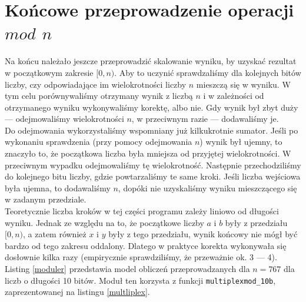 \documentclass[a4paper]{article}
\begin{document}
\section{Końcowe przeprowadzenie operacji $mod$ $n$} \label{mod}
Na końcu należało jeszcze przeprowadzić skalowanie wyniku, by uzyskać rezultat w początkowym zakresie $[0,n)$. Aby to uczynić sprawdzaliśmy dla kolejnych bitów liczby, 
czy odpowiadające im wielokrotności liczby $n$ mieszczą się w wyniku. W tym celu porównywaliśmy otrzymany wynik z liczbą $n$ i w zależności
od otrzymanego wyniku wykonywaliśmy korektę, albo nie. Gdy wynik był zbyt duży --- odejmowaliśmy wielokrotności $n$, w przeciwnym
razie --- dodawaliśmy je. \\ \indent Do odejmowania wykorzystaliśmy wspomniany już kilkukrotnie sumator.
Jeśli po wykonaniu sprawdzenia (przy pomocy odejmowania $n$) wynik był ujemny, to znaczyło to, że 
początkowa liczba była mniejsza od przyjętej wielokrotności. W przeciwnym wypadku odejmowaliśmy tę wielokrotność. Następnie przechodziliśmy do kolejnego
bitu liczby, gdzie powtarzaliśmy te same kroki. Jeśli liczba wejściowa była ujemna, to dodawaliśmy $n$, dopóki nie uzyskaliśmy wyniku mieszczącego się w zadanym przedziale.
\\ \indent Teoretycznie liczba kroków w tej części programu zależy liniowo od długości wyniku. Jednak ze względu na to,
że początkowe liczby $a$ i $b$ były z przedziału $[0,n)$, a zatem również $x$ i $y$ były z tego przedziału, wynik końcowy nie mógł być bardzo od tego zakresu oddalony.
Dlatego w praktyce korekta wykonywała się dosłownie kilka razy (empirycznie sprawdziliśmy, że przeważnie ok. 3 --- 4). \\ \indent
Listing \ref{moduler} przedstawia model obliczeń przeprowadzanych dla $n=767$ dla liczb o długości 10 bitów. Moduł ten korzysta z funkcji \texttt{multiplexmod\_10b}, 
zaprezentowanej na listingu \ref{multliplex}.
\end{document}
